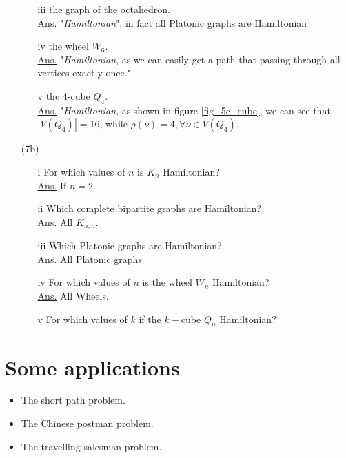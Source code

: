 \documentclass[12pt,a4paper, twocolumn]{article}
\begin{document}
\begin{itemize}
{\begin{itemize}
\begin{figure}[h!]
					\caption{$K_{5,3}$}		
					\label{fig_7_1}
				\end{figure}
				\item[iii] the graph of the octahedron.\\ {\color{black} \underline{Ans.} "\emph{Hamiltonian}", in fact all Platonic graphs are Hamiltonian} 
				\item[iv] the wheel $W_6$.\\ {\color{black} \underline{Ans.} "\emph{Hamiltonian}, as we can easily get a path that passing through all vertices exactly once."} 
				\item[v] the 4-cube $Q_4$.\\ {\color{black} \underline{Ans.} "\emph{Hamiltonian}, as shown in figure \ref{fig_5c_cube}, we can see that $|V(Q_4)| = 16$, while $\rho(\nu) = 4, \forall \nu \in V(Q_4)$}. 
			\end{itemize}
			}
			\hsplit
	\item[(7b)] {\color{blue}
			\begin{itemize}
				\item[i] For which values of $n$ is $K_n$ Hamiltonian? \\ {\color{black} \underline{Ans.} If $n=2$.}
				\item[ii] Which complete bipartite graphs are Hamiltonian?\\ {\color{black} \underline{Ans.} All $K_{n,n}$.} 
				\item[iii] Which Platonic graphs are Hamiltonian?\\ {\color{black} \underline{Ans.} All Platonic graphs} 
				\item[iv] For which values of $n$ is the wheel $W_n$ Hamiltonian?\\ {\color{black} \underline{Ans.} All Wheels.} 

				\item[v] For which values of $k$ if the $k-$cube $Q_n$ Hamiltonian?
			\end{itemize}	
			}
\end{itemize}

\section*{Some applications}
\begin{itemize}
		\item The short path problem.
		\item The Chinese postman problem.
		\item The travelling salesman problem.
\end{itemize}
\end{document}
